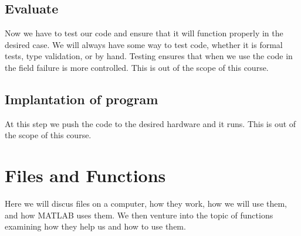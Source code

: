 \documentclass[12pt]{article}
\begin{document}
		\subsection{Evaluate}
			Now we have to test our code and ensure that it will function properly in the desired case.
			We will always have some way to test code,
				whether it is formal tests, type validation, or by hand.
			Testing ensures that when we use the code in the field failure is more controlled.
			This is out of the scope of this course.

		\subsection{Implantation of program}
			At this step we push the code to the desired hardware and it runs.
			This is out of the scope of this course.

	\section{Files and Functions}
		Here we will discus files on a computer,
			how they work,
			how we will use them,
			and how MATLAB uses them.
		We then venture into the topic of functions examining how they help us and how to use them.
\end{document}
